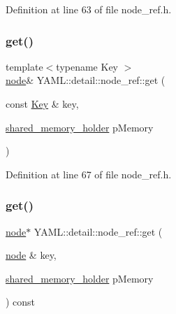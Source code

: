 Definition at line 63 of file node\+\_\+ref.\+h.

\mbox{\label{class_y_a_m_l_1_1detail_1_1node__ref_a9d2ed4bc11b098f700120538c165d4a5}} 
\subsubsection{\texorpdfstring{get()}{get()}\hspace{0.1cm}{\footnotesize\ttfamily [2/4]}}
{\footnotesize\ttfamily template$<$typename Key $>$ \\
\mbox{\hyperlink{class_y_a_m_l_1_1detail_1_1node}{node}}\& Y\+A\+M\+L\+::detail\+::node\+\_\+ref\+::get (\begin{DoxyParamCaption}\item[{const \mbox{\hyperlink{namespace_y_a_m_l_a67c320aa50d3de7ecba1d0b8775dd684a1af533fc24b0311b8c4d5ac2870283aa}{Key}} \&}]{key,  }\item[{\mbox{\hyperlink{namespace_y_a_m_l_1_1detail_a228c4b3b6ba1058b474d40afc218e21d}{shared\+\_\+memory\+\_\+holder}}}]{p\+Memory }\end{DoxyParamCaption})\hspace{0.3cm}{\ttfamily [inline]}}



Definition at line 67 of file node\+\_\+ref.\+h.

\mbox{\label{class_y_a_m_l_1_1detail_1_1node__ref_a34371a9210641b1631816578bfc7d946}} 
\subsubsection{\texorpdfstring{get()}{get()}\hspace{0.1cm}{\footnotesize\ttfamily [3/4]}}
{\footnotesize\ttfamily \mbox{\hyperlink{class_y_a_m_l_1_1detail_1_1node}{node}}$\ast$ Y\+A\+M\+L\+::detail\+::node\+\_\+ref\+::get (\begin{DoxyParamCaption}\item[{\mbox{\hyperlink{class_y_a_m_l_1_1detail_1_1node}{node}} \&}]{key,  }\item[{\mbox{\hyperlink{namespace_y_a_m_l_1_1detail_a228c4b3b6ba1058b474d40afc218e21d}{shared\+\_\+memory\+\_\+holder}}}]{p\+Memory }\end{DoxyParamCaption}) const\hspace{0.3cm}{\ttfamily [inline]}}



